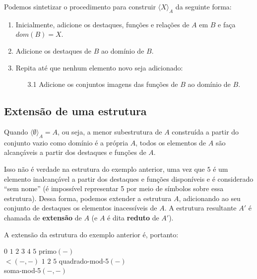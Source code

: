 Podemos sintetizar o procedimento para construir $\langle X \rangle_A$ da seguinte forma:
\begin{enumerate}
    \item Inicialmente, adicione os destaques, funções e relações de $A$ em $B$ e faça $dom(B) = X$.
    \item Adicione os destaques de $B$ ao domínio de $B$.
    \item Repita até que nenhum elemento novo seja adicionado:
    \begin{enumerate}
        \item[3.1] Adicione os conjuntos imagens das funções de $B$ ao domínio de $B$.
    \end{enumerate}  
\end{enumerate}

\subsection{Extensão de uma estrutura}

Quando $\langle \emptyset \rangle_A = A$, ou seja, a menor subestrutura de $A$ construída a partir do conjunto vazio como domínio é a própria $A$, todos os elementos de $A$ são alcançáveis a partir dos destaques e funções de $A$.

Isso não é verdade na estrutura do exemplo anterior, uma vez que $5$ é um elemento inalcançável a partir dos destaques e funções disponíveis e é considerado ``sem nome'' (é impossível representar 5 por meio de símbolos sobre essa estrutura). Dessa forma, podemos extender a estrutura $A$, adicionando ao seu conjunto de destaques os elementos inacessíveis de $A$. A estrutura resultante $A'$ é chamada de \textbf{extensão} de $A$ (e $A$ é dita \textbf{reduto} de $A'$).
    
A extensão da estrutura do exemplo anterior é, portanto:
\begin{center}
    \begin{structure}
        {}
        {$0$ $1$ $2$ $3$ $4$ $5$}
        {primo$(-)$\\$<$$(-,-)$}
        {$1$ $2$ $5$}
        {quadrado-mod-5$(-)$\\soma-mod-5$(-,-)$}
    \end{structure} 
\end{center}